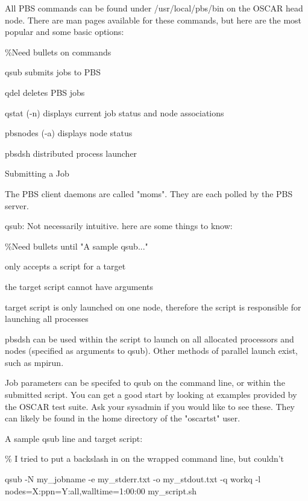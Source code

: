 \documentclass{letter}
\newcommand{\subsection}[1]{\tmsection{\Large #1}}
\begin{document}
\subsection{Using The Portable Batch System (PBS)}\label{app:pbs-overview}

All PBS commands can be found under /usr/local/pbs/bin on the OSCAR head node.
There are man pages available for these commands, but here are the most
popular and some basic options:

\%Need bullets on commands

qsub             submits jobs to PBS

qdel              deletes PBS jobs

qstat (-n)       displays current job status and node associations

pbsnodes (-a)  displays node status

pbsdsh           distributed process launcher{\hspace*{\fill}}

Submitting a Job

The PBS client daemons are called "moms".  They are each polled by the PBS
server.

qsub:  Not necessarily intuitive.  here are some things to know:

\%Need bullets until "A sample qsub..."

only accepts a script for a target

the target script cannot have arguments

target script is only launched on one node, therefore the script is
responsible for launching all processes

pbsdsh can be used within the script to launch on all allocated processors and
nodes (specified as arguments to qsub).  Other methods of parallel launch
exist, such as mpirun.

Job parameters can be specifed to qsub on the command line, or within the
submitted script.  You can get a good start by looking at examples provided by
the OSCAR test suite.  Ask your sysadmin if you would like to see these.  They
can likely be found in the home directory of the "oscartst" user.

A sample qsub line and target script:

\% I tried to put a backslash in on the wrapped command line, but couldn't

qsub -N my\_jobname -e my\_stderr.txt -o my\_stdout.txt -q workq -l
nodes=X:ppn=Y:all,walltime=1:00:00 my\_script.sh
\end{document}
